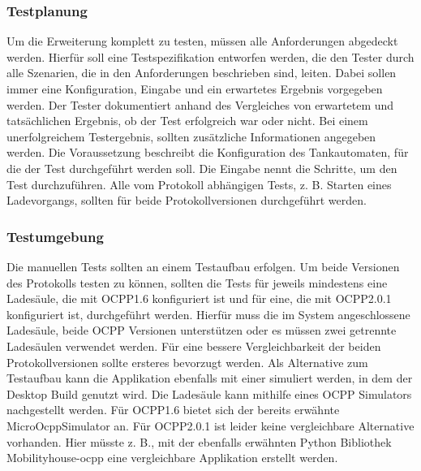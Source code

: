 \subsubsection{Testplanung}
Um die Erweiterung komplett zu testen, müssen alle Anforderungen abgedeckt werden. Hierfür soll eine Testspezifikation entworfen werden, die den Tester durch alle Szenarien, die in den Anforderungen beschrieben sind, leiten. Dabei sollen immer eine Konfiguration, Eingabe und ein erwartetes Ergebnis vorgegeben werden. Der Tester dokumentiert anhand des Vergleiches von erwartetem und tatsächlichen Ergebnis, ob der Test erfolgreich war oder nicht. Bei einem unerfolgreichem Testergebnis, sollten zusätzliche Informationen angegeben werden. Die Voraussetzung beschreibt die Konfiguration des Tankautomaten, für die der Test durchgeführt werden soll. Die Eingabe nennt die Schritte, um den Test durchzuführen. Alle vom Protokoll abhängigen Tests, z. B. Starten eines Ladevorgangs, sollten für beide Protokollversionen durchgeführt werden.
\subsubsection{Testumgebung} \label{Testumgebung}
Die manuellen Tests sollten an einem Testaufbau erfolgen. Um beide Versionen des Protokolls testen zu können, sollten die Tests für jeweils mindestens eine Ladesäule, die mit OCPP1.6 konfiguriert ist und für eine, die mit OCPP2.0.1 konfiguriert ist, durchgeführt werden. Hierfür muss die im System angeschlossene Ladesäule, beide OCPP Versionen unterstützen oder es müssen zwei getrennte Ladesäulen verwendet werden. Für eine bessere Vergleichbarkeit der beiden Protokollversionen sollte ersteres bevorzugt werden.\newline
\noindent Als Alternative zum Testaufbau kann die Applikation ebenfalls mit einer  simuliert werden, in dem der Desktop Build genutzt wird. Die Ladesäule kann mithilfe eines OCPP Simulators nachgestellt werden. Für OCPP1.6 bietet sich der bereits erwähnte MicroOcppSimulator an. Für OCPP2.0.1 ist leider keine vergleichbare Alternative vorhanden. Hier müsste z. B., mit der ebenfalls erwähnten Python Bibliothek \glqq{}Mobilityhouse-ocpp\grqq{} eine vergleichbare Applikation erstellt werden.
